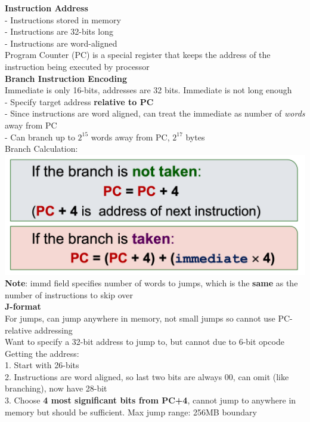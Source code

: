 \documentclass[10pt, a4paper]{article}
\newcommand{\highlight}[1]{{\color{red}\textbf{#1}}}
\begin{document}
\begin{multicols*}{3}
		\textbf{Instruction Address}\\
		- Instructions stored in memory\\
		- Instructions are 32-bits long\\
		- Instructions are word-aligned\\
		Program Counter (PC) is a special register that keeps the address of the instruction being executed by processor\\
		
		\textbf{Branch Instruction Encoding}\\
		Immediate is only 16-bits, addresses are 32 bits. Immediate is not long enough\\
		- Specify target address \textbf{relative to PC}\\
		- Since instructions are word aligned, can treat the immediate as number of \textit{words} away from PC\\
		- Can branch up to $2^{15}$ words away from PC, $2^{17}$ bytes\\
		Branch Calculation:\\
		\includegraphics[scale=.25]{./assets/branchCalculation}\\
		\highlight{Note}: immd field specifies number of words to jumps, which is the \textbf{same} as the number of instructions to skip over\\
		
		\textbf{J-format}\\
		For jumps, can jump anywhere in memory, not small jumps so cannot use PC-relative addressing\\
		Want to specify a 32-bit address to jump to, but cannot due to 6-bit opcode\\
		Getting the address:\\
		1. Start with 26-bits\\
		2. Instructions are word aligned, so last two bits are always 00, can omit (like branching), now have 28-bit\\
		3. Choose \textbf{4 most significant bits from PC+4}, cannot jump to anywhere in memory but should be sufficient. Max jump range: 256MB boundary\\
		

\end{multicols*}
\end{document}
